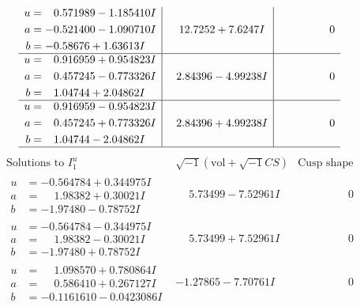 \documentclass[1p]{elsarticle_modified}
\theoremstyle{definition}
\newcommand{\I}{\sqrt{-1}}
\begin{document}
$$\begin{array}{c|c|c}
\begin{aligned}
u &= \phantom{-}0.571989 - 1.185410 I \\
a &= -0.521400 - 1.090710 I \\
b &= -0.58676 + 1.63613 I\end{aligned}
 & \phantom{-}12.7252 + 7.6247 I & \phantom{-0.000000 } 0 \\ \hline\begin{aligned}
u &= \phantom{-}0.916959 + 0.954823 I \\
a &= \phantom{-}0.457245 - 0.773326 I \\
b &= \phantom{-}1.04744 + 2.04862 I\end{aligned}
 & \phantom{-}2.84396 - 4.99238 I & \phantom{-0.000000 } 0 \\ \hline\begin{aligned}
u &= \phantom{-}0.916959 - 0.954823 I \\
a &= \phantom{-}0.457245 + 0.773326 I \\
b &= \phantom{-}1.04744 - 2.04862 I\end{aligned}
 & \phantom{-}2.84396 + 4.99238 I & \phantom{-0.000000 } 0\\
 \hline 
 \end{array}$$\newpage$$\begin{array}{c|c|c}  
\text{Solutions to }I^u_{1}& \I (\text{vol} + \sqrt{-1}CS) & \text{Cusp shape}\\
 \hline 
\begin{aligned}
u &= -0.564784 + 0.344975 I \\
a &= \phantom{-}1.98382 + 0.30021 I \\
b &= -1.97480 - 0.78752 I\end{aligned}
 & \phantom{-}5.73499 - 7.52961 I & \phantom{-0.000000 } 0 \\ \hline\begin{aligned}
u &= -0.564784 - 0.344975 I \\
a &= \phantom{-}1.98382 - 0.30021 I \\
b &= -1.97480 + 0.78752 I\end{aligned}
 & \phantom{-}5.73499 + 7.52961 I & \phantom{-0.000000 } 0 \\ \hline\begin{aligned}
u &= \phantom{-}1.098570 + 0.780864 I \\
a &= \phantom{-}0.586410 + 0.267127 I \\
b &= -0.1161610 - 0.0423086 I\end{aligned}
 & -1.27865 - 7.70761 I & \phantom{-0.000000 } 0 \\ \hline\begin{aligned}

\end{aligned}
\end{array}$$
\end{document}
